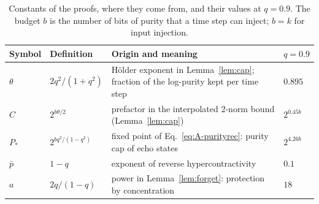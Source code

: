 \documentclass[aps,pra,reprint,superscriptaddress,floatfix]{revtex4-2}
\theoremstyle{plain}
\begin{document}
\begin{table}[t]
\caption{Constants of the proofs, where they come from, and their values at $q=0.9$. The budget $b$ is the number of bits of purity that a time step can inject; $b=k$ for input injection.}
\label{tab:constglossary}
\begingroup
\begin{ruledtabular}
\begin{tabular}{p{1.1cm}p{3.3cm}p{9.2cm}p{2.6cm}}
{\raggedright Symbol\par} & {\raggedright Definition\par} & {\raggedright Origin and meaning\par} & {\raggedright $q=0.9$\par} \\ \hline
{\raggedright $\theta$\par} & {\raggedright $2q^2/(1+q^2)$\par} & {\raggedright H\"older exponent in Lemma~\ref{lem:cap}; fraction of the log-purity kept per time step\par} & {\raggedright $0.895$\par} \\
{\raggedright $C$\par} & {\raggedright $2^{b\theta/2}$\par} & {\raggedright prefactor in the interpolated 2-norm bound (Lemma~\ref{lem:cap})\par} & {\raggedright $2^{0.45b}$\par} \\
{\raggedright $P_*$\par} & {\raggedright $2^{bq^2/(1-q^2)}$\par} & {\raggedright fixed point of Eq.~\eqref{eq:A-purityrec}: purity cap of echo states\par} & {\raggedright $2^{4.26b}$\par} \\
{\raggedright $\bar p$\par} & {\raggedright $1-q$\par} & {\raggedright exponent of reverse hypercontractivity\par} & {\raggedright $0.1$\par} \\
{\raggedright $a$\par} & {\raggedright $2q/(1-q)$\par} & {\raggedright power in Lemma~\ref{lem:forget}: protection by concentration\par} & {\raggedright $18$\par} \\

\end{tabular}
\end{ruledtabular}
\end{table}
\end{document}
